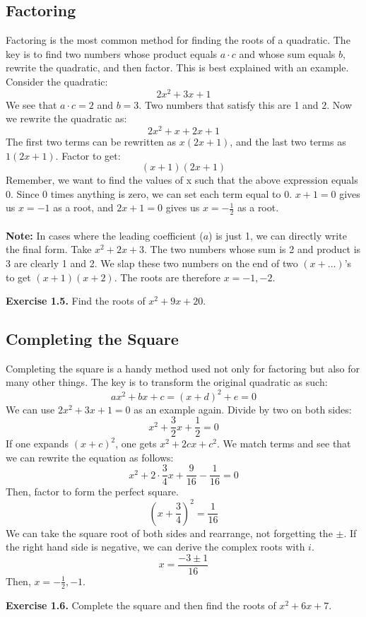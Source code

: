 \documentclass{article}
\begin{document}
\subsection{Factoring}
Factoring is the most common method for finding the roots of a quadratic. The key is to find two numbers whose product equals $a\cdot c$ and whose sum equals $b$, rewrite the quadratic, and then factor. This is best explained with an example. Consider the quadratic: $$2x^2+3x+1$$
We see that $a \cdot c = 2$ and $b = 3$. Two numbers that satisfy this are 1 and 2. Now we rewrite the quadratic as:
$$2x^2+x+2x+1$$
The first two terms can be rewritten as $x(2x+1)$, and the last two terms as $1(2x+1)$. Factor to get:
$$(x+1)(2x+1)$$
Remember, we want to find the values of x such that the above expression equals 0. Since 0 times anything is zero, we can set each term equal to 0. $x+1=0$ gives us $x=-1$ as a root, and $2x+1=0$ gives us $x=-\frac{1}{2}$ as a root.\\\\
\textbf{Note:} In cases where the leading coefficient ($a$) is just 1, we can directly write the final form. Take $x^2+2x+3$. The two numbers whose sum is 2 and product is 3 are clearly 1 and 2. We slap these two numbers on the end of two $(x + \dots)$'s to get $(x+1)(x+2)$. The roots are therefore $x=-1,-2$.
\begin{mdframed}
  \textbf{Exercise 1.5.} Find the roots of $x^2+9x+20$.
\end{mdframed}

\subsection{Completing the Square}
Completing the square is a handy method used not only for factoring but also for many other things. The key is to transform the original quadratic as such:
$$ax^2+bx+c=(x+d)^2+e=0$$
We can use $2x^2+3x+1=0$ as an example again. Divide by two on both sides:
$$x^2+\frac{3}{2}x+\frac{1}{2}=0$$
If one expands $(x+c)^2$, one gets $x^2+2cx+c^2$. We match terms and see that we can rewrite the equation as follows:
$$x^2+2 \cdot \frac{3}{4}x+\frac{9}{16}-\frac{1}{16}=0$$
Then, factor to form the perfect square.
$$(x+\frac{3}{4})^2=\frac{1}{16}$$
We can take the square root of both sides and rearrange, not forgetting the $\pm$. If the right hand side is negative, we can derive the complex roots with $i$.
$$x=\frac{-3\pm1}{16}$$
Then, $x=-\frac{1}{2},-1$.
\begin{mdframed}
  \textbf{Exercise 1.6.} Complete the square and then find the roots of $x^2+6x+7$.
\end{mdframed}
\end{document}

